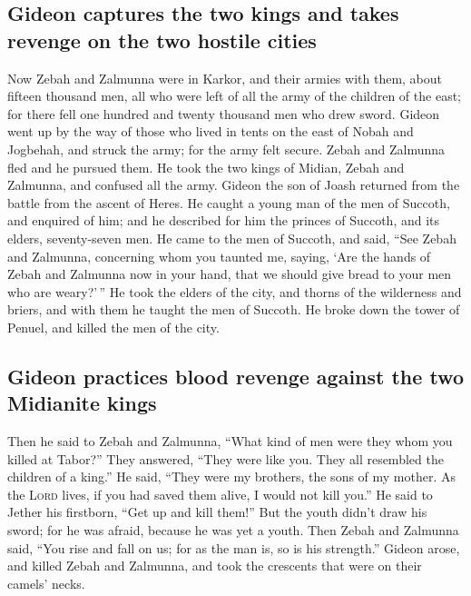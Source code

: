 \hypertarget{gideon-captures-the-two-kings-and-takes-revenge-on-the-two-hostile-cities}{%
\subsection{Gideon captures the two kings and takes revenge on the two
hostile
cities}\label{gideon-captures-the-two-kings-and-takes-revenge-on-the-two-hostile-cities}}

 Now Zebah and Zalmunna were in Karkor, and their armies
with them, about fifteen thousand men, all who were left of all the army
of the children of the east; for there fell one hundred and twenty
thousand men who drew sword.  Gideon went up by the way
of those who lived in tents on the east of Nobah and Jogbehah, and
struck the army; for the army felt secure.  Zebah and
Zalmunna fled and he pursued them. He took the two kings of Midian,
Zebah and Zalmunna, and confused all the army.  Gideon
the son of Joash returned from the battle from the ascent of Heres.
 He caught a young man of the men of Succoth, and
enquired of him; and he described for him the princes of Succoth, and
its elders, seventy-seven men.  He came to the men of
Succoth, and said, ``See Zebah and Zalmunna, concerning whom you taunted
me, saying, `Are the hands of Zebah and Zalmunna now in your hand, that
we should give bread to your men who are weary?'\,''  He
took the elders of the city, and thorns of the wilderness and briers,
and with them he taught the men of Succoth.  He broke
down the tower of Penuel, and killed the men of the city.

\hypertarget{gideon-practices-blood-revenge-against-the-two-midianite-kings}{%
\subsection{Gideon practices blood revenge against the two Midianite
kings}\label{gideon-practices-blood-revenge-against-the-two-midianite-kings}}

 Then he said to Zebah and Zalmunna, ``What kind of men
were they whom you killed at Tabor?'' They answered, ``They were like
you. They all resembled the children of a king.''  He
said, ``They were my brothers, the sons of my mother. As the
\textsc{Lord} lives, if you had saved them alive, I would not kill
you.''  He said to Jether his firstborn, ``Get up and
kill them!'' But the youth didn't draw his sword; for he was afraid,
because he was yet a youth.  Then Zebah and Zalmunna
said, ``You rise and fall on us; for as the man is, so is his
strength.'' Gideon arose, and killed Zebah and Zalmunna, and took the
crescents that were on their camels' necks.

